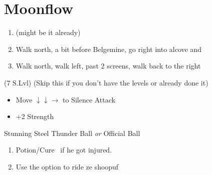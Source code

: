 \chapter{Moonflow}

\begin{enumerate}
    \item \formation{\tidus}{\kimahri}{\auron} (might be it already)
    \item Walk north, a bit before Belgemine, go right into alcove and 
    \item Walk north, walk left, past 2 screens, walk back to the right
\end{enumerate}
\begin{spheregrid}
    \begin{itemize}
        \wakkaf (7 S.Lvl) (Skip this if you don't have the levels or already done it)
        \begin{itemize}
            \item Move $\downarrow\downarrow\rightarrow$ to Silence Attack
            \item +2 Strength
        \end{itemize}
    \end{itemize}
\end{spheregrid}
\begin{equip}
    \begin{itemize}
        \tidusf Stunning Steel
        \wakkaf Thunder Ball \textit{or} Official Ball
    \end{itemize}
\end{equip}
\begin{enumerate}[resume]
    \item Potion/Cure \tidus\ if he got injured.
    \item Use the  option to ride ze shoopuf
\end{enumerate}
